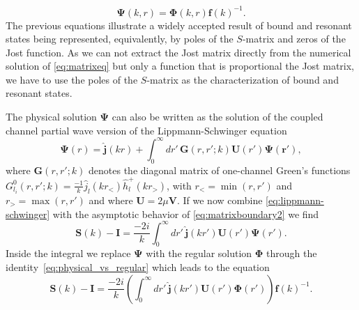 \documentclass[mathpazo]{cicp}
\begin{document}
\begin{equation}
	\label{eq:physical_vs_regular}
	\mathbold{\Psi}(k,r) = \mathbold{\Phi}(k,r){\mathbold{f}(k)}^{-1}.
\end{equation}
The previous equations illustrate a widely accepted result of bound and resonant states being represented, equivalently, by poles of the $S$-matrix and zeros of the Jost function. As we can not extract the Jost matrix directly from the numerical solution of \eqref{eq:matrixeq} but only a function that is proportional the Jost matrix, we have to use the poles of the $S$-matrix as the characterization of bound and resonant states.

The physical solution $\mathbold{\Psi}$ can also be written as the solution of the coupled channel partial wave version of the Lippmann-Schwinger equation
\begin{equation}
	\label{eq:lippmann-schwinger}
	\mathbold{\Psi}(r) = \hat{\mathbold{j}}(kr) + \int_{0}^{\infty}dr'\, \mathbold{G}(r,r';k)\mathbold{U}(r')\mathbold{\Psi(r')},
\end{equation}
where $\mathbold{G}(r,r';k)$ denotes the diagonal matrix of one-channel Green's functions $G_{l_{i}}^{0}(r,r';k) = \frac{-1}{k}\hat{j}_{l}(kr_{<})\hat{h}_{l}^{+}(kr_{>})$, with $r_{<} = \min(r,r')$ and $r_{>} = \max(r,r')$ and where $\mathbold{U}=2\mu\mathbold{V}$.
If we now combine \eqref{eq:lippmann-schwinger} with the asymptotic behavior of \eqref{eq:matrixboundary2} we find
\begin{equation}
	\mathbold{S}(k) - \mathbold{I} = \frac{-2i}{k} \int_{0}^{\infty} dr'\, \hat{\mathbold{j}}(kr') \mathbold{U}(r') \mathbold{\Psi}(r').
\end{equation}
Inside the integral we replace $\mathbold{\Psi}$ with the regular solution $\mathbold{\Phi}$ through the identity~\eqref{eq:physical_vs_regular} which leads to the equation
\begin{equation}
	\label{eq:145907062010}
	\mathbold{S}(k) - \mathbold{I} = \frac{-2i}{k}\left( \int_{0}^{\infty} dr'\, \hat{\mathbold{j}}(kr') \mathbold{U}(r') \mathbold{\Phi}(r') \right){\mathbold{f}(k)}^{-1}.
\end{equation}
\end{document}

